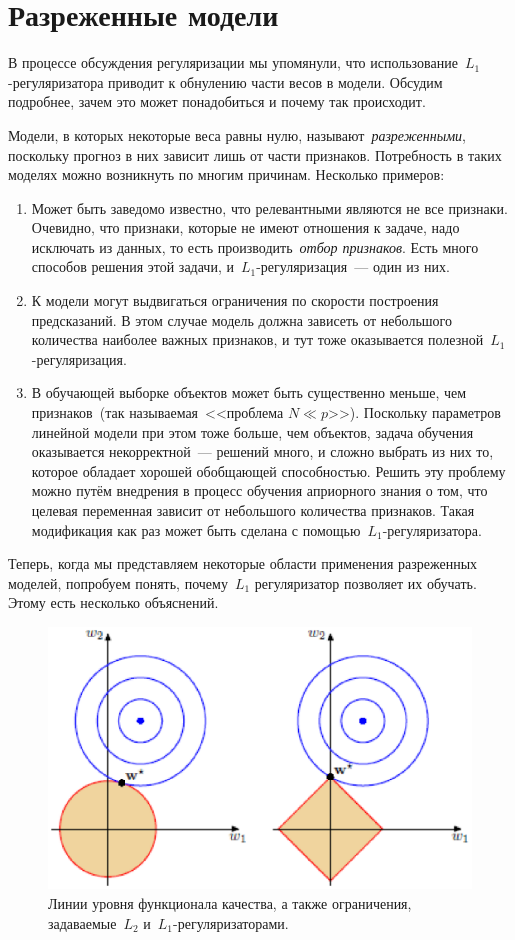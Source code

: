 \documentclass[12pt,fleqn]{article}
\begin{document}
\section{Разреженные модели}

В процессе обсуждения регуляризации мы упомянули, что использование~$L_1$-регуляризатора
приводит к обнулению части весов в модели.
Обсудим подробнее, зачем это может понадобиться и почему так происходит.

Модели, в которых некоторые веса равны нулю, называют~\emph{разреженными},
поскольку прогноз в них зависит лишь от части признаков.
Потребность в таких моделях можно возникнуть по многим причинам.
Несколько примеров:
\begin{enumerate}
    \item Может быть заведомо известно, что релевантными являются не все признаки.
        Очевидно, что признаки, которые не имеют отношения к задаче, надо исключать из данных,
        то есть производить~\emph{отбор признаков}.
        Есть много способов решения этой задачи, и~$L_1$-регуляризация~--- один из них.
    \item К модели могут выдвигаться ограничения по скорости построения предсказаний.
        В этом случае модель должна зависеть от небольшого количества наиболее важных признаков,
        и тут тоже оказывается полезной~$L_1$-регуляризация.
    \item В обучающей выборке объектов может быть существенно меньше, чем признаков~(так называемая~<<проблема $N \ll p$>>).
        Поскольку параметров линейной модели при этом тоже больше, чем объектов, задача обучения оказывается
        некорректной~--- решений много, и сложно выбрать из них то, которое обладает
        хорошей обобщающей способностью.
        Решить эту проблему можно путём внедрения в процесс обучения априорного знания о том,
        что целевая переменная зависит от небольшого количества признаков.
        Такая модификация как раз может быть сделана с помощью~$L_1$-регуляризатора.
\end{enumerate}
Теперь, когда мы представляем некоторые области применения разреженных моделей,
попробуем понять, почему~$L_1$ регуляризатор позволяет их обучать.
Этому есть несколько объяснений.

\begin{figure}[t]
    \centering
    \includegraphics[width=0.5\linewidth]{pics/reg.eps}
    \caption{Линии уровня функционала качества, а также ограничения,
        задаваемые~$L_2$ и~$L_1$-регуляризаторами.}
    \label{pic:regularizers}
\end{figure}
\end{document}
